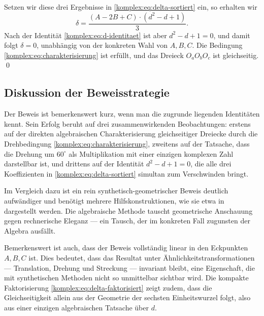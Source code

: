 Setzen wir diese drei Ergebnisse in \eqref{komplex:eq:delta-sortiert} ein,
so erhalten wir
\begin{equation}
\delta
=
\frac{(A - 2 B + C) \cdot (d^2 - d + 1)}{3} .
\label{komplex:eq:delta-faktorisiert}
\end{equation}
Nach der Identität \eqref{komplex:eq:d-identitaet} ist aber
$d^2 - d + 1 = 0$, und damit folgt $\delta = 0$,
unabhängig von der konkreten Wahl von $A, B, C$.
Die Bedingung \eqref{komplex:eq:charakterisierung} ist erfüllt,
und das Dreieck $O_a O_b O_c$ ist gleichseitig.
\qed

%
%
\subsection{Diskussion der Beweisstrategie
\label{komplex:subsection:diskussion}}
Der Beweis ist bemerkenswert kurz, wenn man die zugrunde liegenden
Identitäten kennt.
Sein Erfolg beruht auf drei zusammenwirkenden Beobachtungen:
erstens auf der direkten algebraischen Charakterisierung gleichseitiger
Dreiecke durch die Drehbedingung \eqref{komplex:eq:charakterisierung},
zweitens auf der Tatsache, dass die Drehung um $60^\circ$ als
Multiplikation mit einer einzigen komplexen Zahl darstellbar ist,
und drittens auf der Identität $d^2 - d + 1 = 0$, die alle drei
Koeffizienten in \eqref{komplex:eq:delta-sortiert} simultan zum
Verschwinden bringt.

Im Vergleich dazu ist ein rein synthetisch-geometrischer Beweis deutlich
aufwändiger und benötigt mehrere Hilfskonstruktionen,
wie sie etwa in~\cite{komplex:coxeter} dargestellt werden.
Die algebraische Methode tauscht geometrische Anschauung gegen
rechnerische Eleganz --- ein Tausch, der im konkreten Fall zugunsten
der Algebra ausfällt.

Bemerkenswert ist auch, dass der Beweis vollständig linear in den
Eckpunkten $A, B, C$ ist.
Dies bedeutet, dass das Resultat unter Ähnlichkeitstransformationen ---
%
Translation, Drehung und Streckung --- invariant bleibt,
eine Eigenschaft, die mit synthetischen Methoden nicht so unmittelbar
sichtbar wird.
Die kompakte Faktorisierung \eqref{komplex:eq:delta-faktorisiert} zeigt
zudem, dass die Gleichseitigkeit allein aus der Geometrie der sechsten
Einheitswurzel folgt, also aus einer einzigen algebraischen Tatsache über
%
$d$.
